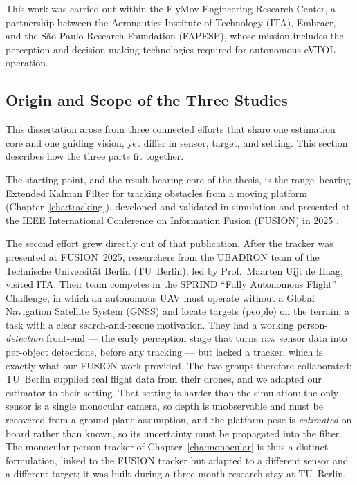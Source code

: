 This work was carried out within the FlyMov Engineering Research Center, a
partnership between the Aeronautics Institute of Technology (ITA), Embraer, and
the São Paulo Research Foundation (FAPESP), whose mission includes the
perception and decision-making technologies required for autonomous eVTOL
operation.

\subsection{Origin and Scope of the Three Studies}
\label{sec:origin}

This dissertation arose from three connected efforts that share one estimation
core and one guiding vision, yet differ in sensor, target, and setting. This
section describes how the three parts fit together.

The starting point, and the result-bearing core of the thesis, is the
range--bearing Extended Kalman Filter for tracking obstacles from a moving
platform (Chapter~\ref{cha:tracking}), developed and validated in simulation and
presented at the IEEE International Conference on Information Fusion (FUSION) in
2025 \cite{delima2025fusion}.

The second effort grew directly out of that publication. After the tracker was
presented at FUSION~2025, researchers from the UBADRON team of the Technische
Universit\"at Berlin (TU~Berlin), led by Prof.~Maarten Uijt de Haag, visited ITA.
Their team competes in the SPRIND ``Fully Autonomous Flight'' Challenge, in which
an autonomous UAV must operate without a Global Navigation Satellite System
(GNSS) and locate targets (people) on the terrain, a task with a clear
search-and-rescue motivation. They had a working
person-\emph{detection} front-end --- the early perception stage that turns raw
sensor data into per-object detections, before any tracking --- but lacked a
tracker, which is exactly what our FUSION work provided. The two groups therefore collaborated: TU~Berlin supplied
real flight data from their drones, and we adapted our estimator to their setting.
That setting is harder than the simulation: the only sensor is a single
monocular camera, so depth is unobservable and must be recovered from a
ground-plane assumption, and the platform pose is \emph{estimated} on board rather
than known, so its uncertainty must be propagated into the filter. The monocular
person tracker of Chapter~\ref{cha:monocular} is thus a distinct formulation,
linked to the FUSION tracker but adapted to a different sensor and a different
target; it was built during a three-month research stay at TU~Berlin.

